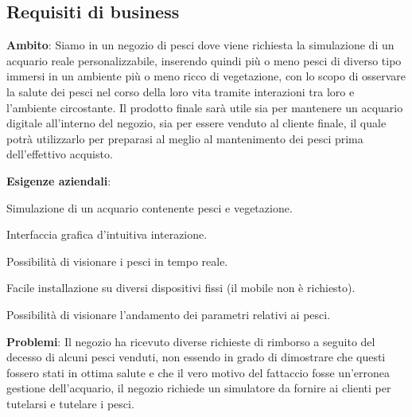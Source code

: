 \documentclass[12pt,a4paper,oneside,article]{article}
\begin{document}
    \subsection{Requisiti di business}
	 \begin{legal}[label*=1.\arabic*.]
	 	\item \textbf{Ambito}: Siamo in un negozio di pesci dove viene richiesta la simulazione di un acquario reale personalizzabile, inserendo quindi più o meno pesci di diverso tipo immersi in un ambiente più o meno ricco di vegetazione, con lo scopo di osservare la salute dei pesci nel corso della loro vita tramite interazioni tra loro e l'ambiente circostante.
	 	Il prodotto finale sarà utile sia per mantenere un acquario digitale all'interno del negozio, sia per essere venduto al cliente finale, il quale potrà utilizzarlo per preparasi al meglio al mantenimento dei pesci prima dell'effettivo acquisto. 
	 	\item \textbf{Esigenze aziendali}:
	 	\begin{legal}
	 		\item Simulazione di un acquario contenente pesci e vegetazione.
	 		\item Interfaccia grafica d'intuitiva interazione.
	 		\item Possibilità di visionare i pesci in tempo reale.
	 		\item Facile installazione su diversi dispositivi fissi (il mobile non è richiesto).
	 		\item Possibilità di visionare l'andamento dei parametri relativi ai pesci.
	 	\end{legal}
	 	\item \textbf{Problemi}: Il negozio ha ricevuto diverse richieste di rimborso a seguito del decesso di alcuni pesci venduti, non essendo in grado di dimostrare che questi fossero stati in ottima salute e che il vero motivo del fattaccio fosse un'erronea gestione dell'acquario, il negozio richiede un simulatore da fornire ai clienti per tutelarsi e tutelare i pesci.
	 \end{legal}
\end{document}
